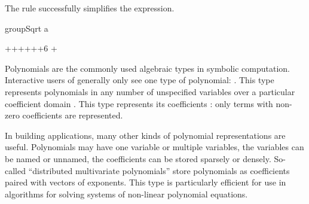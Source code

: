 {{{{{{{{\begin{xtc}
\begin{xtccomment}
The rule
 successfully simplifies the expression.
\end{xtccomment}
\begin{spadsrc}
groupSqrt a 
\end{spadsrc}
\begin{TeXOutput}
\begin{fricasmath}{22}
\TIMES \sqrt%
{\TIMES {}}+\TIMES {}+\TIMES {}++\TIMES {}++6\TIMES {}\TIMES %
+%
\end{fricasmath}
\end{TeXOutput}
\end{xtc}

%

Polynomials are the commonly used algebraic types in symbolic
computation.
Interactive users of \Language{} generally only see one type
of polynomial: .
This type represents polynomials in any number of unspecified
variables over a particular coefficient domain .
This type represents its coefficients
: only terms with non-zero
coefficients are represented.

In building applications, many other kinds of polynomial
representations are useful.
Polynomials may have one variable or multiple variables, the
variables can be named or unnamed, the coefficients can be stored
sparsely or densely.
So-called ``distributed multivariate polynomials'' store
polynomials as coefficients paired with vectors of exponents.
This type is particularly efficient for use in algorithms for
solving systems of non-linear polynomial equations.

}}}}}}}}
